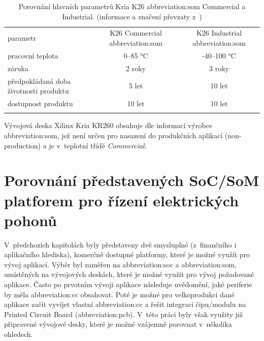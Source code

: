 \documentclass[a4paper, twoside, 11pt]{article}
\begin{document}
					\begin{table}[htbp!]
						\centering
						\caption{Porovnání hlavních parametrů Kria K26 \gls{abbreviation:som} Commercial a Industrial. (informace a značení převzaty z~\cite{kria-k26-som-product-brief})}
						  \vspace*{0.15cm}
						   \resizebox{\textwidth}{!}
							{
								\begin{tabular}{!{\vrule width 2pt} l | c | c !{\vrule width 2pt}}
								parametr & K26 Commercial \gls{abbreviation:som} & K26 Industrial \gls{abbreviation:som} \\
								pracovní teplota & 0–85 °C & -40–100 °C\\ \hline
								záruka & 2 roky & 3 roky\\ \hline
								předpokládaná doba životnosti produktu & 5 let & 10 let\\ \hline 
								dostupnost produktu & 10 let & 10 let \\
								\end{tabular}
							}
						\label{tab:xilinx-kria-som-variants}
					\end{table}

					Vývojová deska Xilinx Kria KR260 obsahuje dle informací výrobce \gls{abbreviation:som}, jež není určen pro nasazení do produkčních aplikací (non-production) a je v~teplotní třídě \textit{Commercial}. \cite{kria-k26-som-ds}
				

			\section{Porovnání představených SoC/SoM platforem pro řízení elektrických pohonů}
			V~předchozích kapitolách byly představeny dvě smysluplné (z~finančního i aplikačního hlediska), komerčně dostupné platformy, které je možné využít pro vývoj aplikací. Výběr byl zaměřen na \gls{abbreviation:soc} a \gls{abbreviation:som}, umístěných na vývojových deskách, které je možné využít pro vývoj požadované aplikace. Často po prvotním vývoji aplikace následuje uvědomění, jaké periferie by měla \gls{abbreviation:cc} obsahovat. Poté je možné pro velkoprodukci dané aplikace začít vyvíjet vlastní \gls{abbreviation:cc} a řešit integraci čipu/modulu na Printed Circuit Board (\gls{abbreviation:pcb}). V~této práci byly však využity již připravené vývojové desky, které je možné vzájemně porovnat v~několika ohledech.\par
\end{document}
